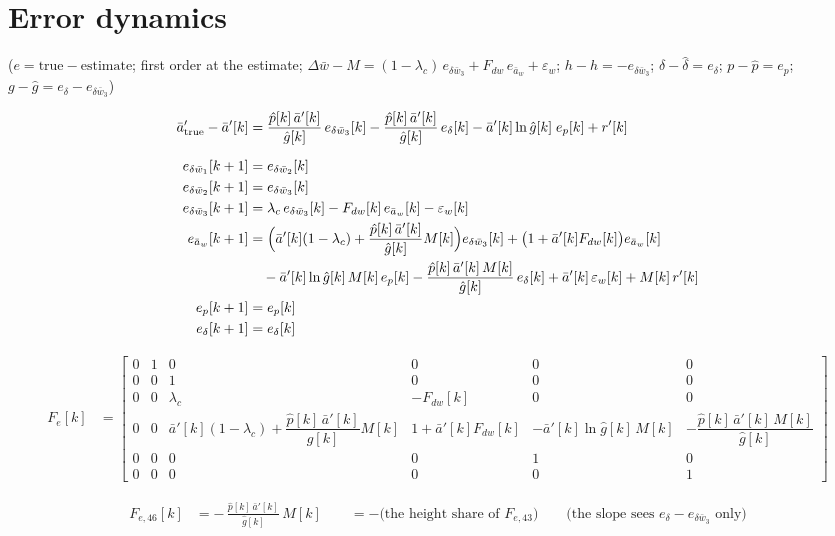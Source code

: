 \documentclass[11pt,a4paper,fontset=none]{ctexart}
\newcommand{\ba}{\bar{a}}
\newcommand{\bw}{\bar{w}}
\newcommand{\dW}{\Delta\bw}
\newcommand{\ap}{\ba'}
\newcommand{\hh}{\hat{h}}
\newcommand{\ph}{\hat{p}}
\newcommand{\dl}{\delta}
\newcommand{\dlh}{\hat{\delta}}
\newcommand{\gs}{g}
\newcommand{\gh}{\hat{g}}
\begin{document}
\section{Error dynamics}

($e = \text{true} - \text{estimate}$; first order at the estimate; $\dW - M = (1-\lambda_c)\,e_{\delta\bw_3} + F_{dw}\,e_{\ba_w} + \varepsilon_w$;
$h - \hh = -e_{\delta\bw_3}$; $\dl - \dlh = e_{\dl}$; $p - \ph = e_p$; $\gs - \gh = e_{\dl} - e_{\delta\bw_3}$)

\begin{align*}
\ap_{\mathrm{true}} - \ap[k] &= \frac{\ph[k]\,\ap[k]}{\gh[k]}\,e_{\delta\bw_3}[k] - \frac{\ph[k]\,\ap[k]}{\gh[k]}\,e_{\dl}[k] - \ap[k]\ln\gh[k]\;e_p[k] + r'[k] \\[6pt]
e_{\delta\bw_1}[k+1] &= e_{\delta\bw_2}[k] \\
e_{\delta\bw_2}[k+1] &= e_{\delta\bw_3}[k] \\
e_{\delta\bw_3}[k+1] &= \lambda_c\,e_{\delta\bw_3}[k] - F_{dw}[k]\,e_{\ba_w}[k] - \varepsilon_w[k] \\
e_{\ba_w}[k+1]       &= \Bigl(\ap[k](1-\lambda_c) + \frac{\ph[k]\,\ap[k]}{\gh[k]}M[k]\Bigr)e_{\delta\bw_3}[k]
                        + \bigl(1 + \ap[k]F_{dw}[k]\bigr)e_{\ba_w}[k] \\
                     &\quad - \ap[k]\ln\gh[k]\,M[k]\,e_p[k]
                        - \frac{\ph[k]\,\ap[k]\,M[k]}{\gh[k]}\,e_{\dl}[k]
                        + \ap[k]\,\varepsilon_w[k] + M[k]\,r'[k] \\
e_p[k+1]             &= e_p[k] \\
e_{\dl}[k+1]         &= e_{\dl}[k]
\end{align*}

\begin{align*}
F_e[k] &= \begin{bmatrix}
0 & 1 & 0 & 0 & 0 & 0 \\
0 & 0 & 1 & 0 & 0 & 0 \\
0 & 0 & \lambda_c & -F_{dw}[k] & 0 & 0 \\
0 & 0 & \ap[k](1-\lambda_c) + \dfrac{\ph[k]\,\ap[k]}{\gh[k]}M[k] & 1 + \ap[k]F_{dw}[k] & -\ap[k]\ln\gh[k]\,M[k] & -\dfrac{\ph[k]\,\ap[k]\,M[k]}{\gh[k]} \\
0 & 0 & 0 & 0 & 1 & 0 \\
0 & 0 & 0 & 0 & 0 & 1
\end{bmatrix}
\end{align*}

\begin{align*}
F_{e,46}[k] &= -\,\frac{\ph[k]\,\ap[k]}{\gh[k]}\,M[k] \qquad = -\bigl(\text{the height share of } F_{e,43}\bigr)
\qquad\text{(the slope sees } e_{\dl} - e_{\delta\bw_3}\text{ only)}
\end{align*}
\end{document}
